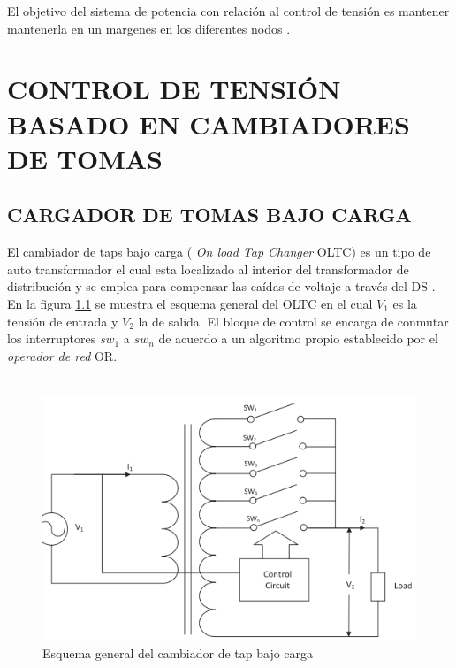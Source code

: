 \documentclass[12pt, letterpaper]{report}
\begin{document}

El objetivo del sistema de potencia con relación al control de tensión es mantener mantenerla en un margenes en los diferentes nodos \cite{Liu2012}. 


\chapter{CONTROL DE TENSIÓN BASADO EN CAMBIADORES DE TOMAS}
\label{cap_oltc} 

\section{CARGADOR DE TOMAS BAJO CARGA}

El cambiador de taps bajo carga  ( \textit{On load Tap Changer } OLTC) es un tipo de auto transformador el cual esta localizado al interior del transformador de distribución y  se emplea para compensar las caídas de voltaje  a través del DS \cite{Castro2016}. En la figura \ref{fig:esquema_OLTC} se muestra el esquema general del OLTC en el cual $V_{1}$ es la tensión de entrada  y $V_{2}$ la de salida. El bloque  de control se encarga de conmutar los interruptores $sw_{1}$ a $sw_{n}$ de acuerdo a un algoritmo propio establecido por el \textit{operador de red} OR.\\\\
\begin{figure}[h]
    \centering
    \includegraphics[width=0.6\linewidth]{imagenes/cap_1/Selection_275}
    \caption{Esquema general del cambiador de tap bajo carga \cite{Castro2016}}
    \label{fig:esquema_OLTC}
\end{figure}
\end{document}
